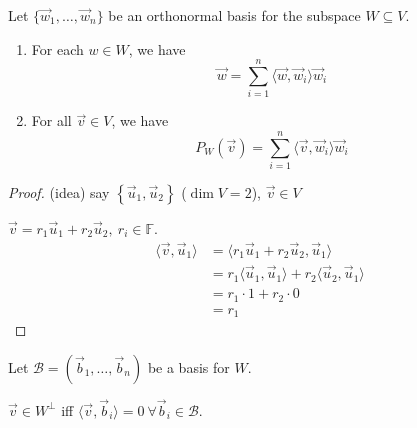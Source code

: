 \documentclass[11pt,fleqn]{book} %
\begin{document}
\begin{proposition}
    Let $\{ \vec{w}_1, \dots, \vec{w}_n \}$ be an orthonormal basis for the subspace $W \subseteq V$. 
    
    \begin{enumerate}[label=\alph*)]
        \item For each $w \in W$, we have $$\vec{w} = \sum_{i=1}^n \langle \vec{w}, \vec{w}_i \rangle \vec{w}_i$$
        \item For all $\vec{v} \in V$, we have $$P_W(\vec{v}) = \sum_{i=1}^n \langle \vec{v}, \vec{w}_i \rangle \vec{w}_i$$
    \end{enumerate}
\end{proposition}
\setcounter{chapter}{3}

\begin{proof}
    (idea) say $\left\{ \vec{u}_1, \vec{u}_2 \right\}$ ($\dim V = 2$), $\vec{v} \in V$

    $\vec{v} = r_1\vec{u}_1 + r_2\vec{u}_2,~ r_i \in \mathbb{F}$. 
    \begin{align*}
        \langle \vec{v}, \vec{u}_1 \rangle
        &= \langle r_1\vec{u}_1 + r_2\vec{u}_2, \vec{u}_1 \rangle
        \\
        &= r_1\langle \vec{u}_1, \vec{u}_1 \rangle + r_2 \langle \vec{u}_2, \vec{u}_1 \rangle
        \\
        &= r_1 \cdot 1 + r_2 \cdot 0
        \\
        &= r_1
    \end{align*}
\end{proof}

\setcounter{section}{0}
\setcounter{dummy}{4}
\begin{lemma}
    Let $\mathcal{B} = (\vec{b}_1, \dots, \vec{b}_n)$ be a basis for $W$. 
    
    $\vec{v} \in W^\perp$ iff $\langle \vec{v}, \vec{b}_i \rangle = 0 ~ \forall \vec{b}_i \in \mathcal{B}$. 
\end{lemma}
\setcounter{section}{4}
\end{document}
